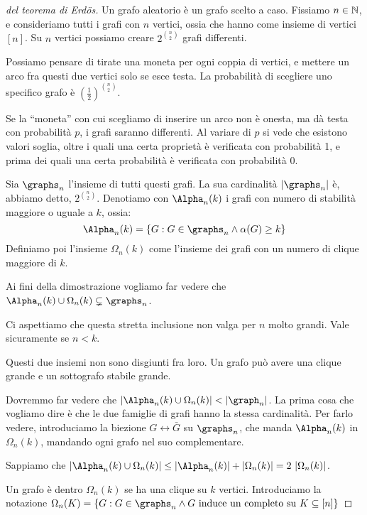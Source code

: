 \begin{proof}[del teorema di Erd\"os]
	Un grafo aleatorio \`e un grafo scelto a caso.
	Fissiamo $n \in \mathbb{N}$, e consideriamo tutti i grafi con $n$ vertici, ossia che hanno come insieme di vertici $[n]$.
	Su $n$ vertici possiamo creare $2^{\binom{n}{2}}$ grafi differenti.

	Possiamo pensare di tirate una moneta per ogni coppia di vertici, e mettere un arco fra questi due vertici solo se esce testa.
	La probabilit\`a di scegliere uno specifico grafo \`e ${\left( \frac{1}{2} \right)}^{\binom{n}{2}}$.

	Se la ``moneta'' con cui scegliamo di inserire un arco non \`e onesta, ma d\`a testa con probabilit\`a $p$, i grafi saranno differenti.
	Al variare di $p$ si vede che esistono valori soglia, oltre i quali una certa propriet\`a \`e verificata con probabilit\`a 1, e prima dei quali una certa probabilit\`a \`e verificata con probabilit\`a 0.

	Sia $\graphs_n$ l'insieme di tutti questi grafi.
	La sua cardinalit\`a $\abs{\graphs_n}$ \`e, abbiamo detto, $2^{\binom{n}{2}}$.
	Denotiamo con $\Alpha_n(k)$ i grafi con numero di stabilit\`a maggiore o uguale a $k$, ossia:
	\[
		\Alpha_n(k) = \{ G : G \in \graphs_n \land \alpha(G) \ge k \}
	\]
	Definiamo poi l'insieme $\Omega_n (k)$ come l'insieme dei grafi con un numero di clique maggiore di $k$.

	Ai fini della dimostrazione vogliamo far vedere che $\Alpha_n (k) \cup \Omega_n (k) \subsetneq \graphs_n$.

	Ci aspettiamo che questa stretta inclusione non valga per $n$ molto grandi.
	Vale sicuramente se $n < k$. %

	Questi due insiemi non sono disgiunti fra loro.
	Un grafo pu\`o avere una clique grande e un sottografo stabile grande.

	Dovremmo far vedere che $\abs{\Alpha_n (k) \cup \Omega_n (k)} < \abs{\graph_n}$.
	La prima cosa che vogliamo dire \`e che le due famiglie di grafi hanno la stessa cardinalit\`a.
	Per farlo vedere, introduciamo la biezione $G \leftrightarrow \bar{G}$ su $\graphs_n$, che manda $\Alpha_n (k)$ in $\Omega_n (k)$, mandando ogni grafo nel suo complementare.

	Sappiamo che $\abs{\Alpha_n (k) \cup \Omega_n (k)} \le \abs{\Alpha_n (k)} + \abs{\Omega_n (k)} = 2 \, \abs{\Omega_n (k)}$.

	Un grafo \`e dentro $\Omega_n (k)$ se ha una clique su $k$ vertici.
	Introduciamo la notazione $\Omega_n (K) = \{ G : G \in \graphs_n \land G \text{ induce un completo su } K \subseteq [n] \}$


\end{proof}
